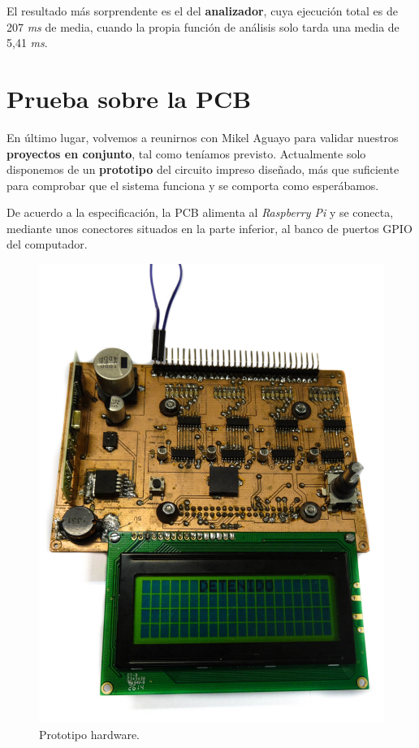 El resultado más sorprendente es el del \textbf{analizador}, cuya ejecución total es de 207 \textit{ms} de media, cuando la propia función de análisis solo tarda una media de 5,41 \textit{ms}.

\newpage

\section{Prueba sobre la PCB}

En último lugar, volvemos a reunirnos con Mikel Aguayo para validar nuestros \textbf{proyectos en conjunto}, tal como teníamos previsto. Actualmente solo disponemos de un \textbf{prototipo} del circuito impreso diseñado, más que suficiente para comprobar que el sistema funciona y se comporta como esperábamos.

De acuerdo a la especificación, la \acrshort{PCB} alimenta al \textit{Raspberry Pi} y se conecta, mediante unos conectores situados en la parte inferior, al banco de puertos \acrshort{GPIO} del computador.

\smallskip

\begin{figure}[H]
	\noindent \begin{centering}
		\includegraphics[width=\linewidth*3/4]{capitulo6/pcb}
		\par\end{centering}
	\smallskip
	\caption{\label{fig:pcb} Prototipo hardware.}
\end{figure} 

